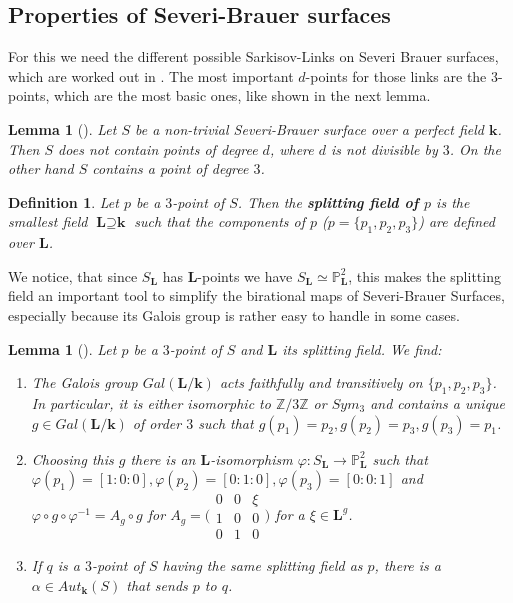 \documentclass[12pt, oneside, reqno]{amsart}
\newtheorem{lemma}[theorem]{Lemma}
\newtheorem{definition}[theorem]{Definition}
\begin{document}
\subsection{Properties of Severi-Brauer surfaces}
For this we need the different possible Sarkisov-Links on Severi Brauer surfaces, which are worked out in \cite{BSY}. The most important $d$-points for those links are the $3$-points, which are the most basic ones, like shown in the next lemma. 
\begin{lemma}[{\cite[Corollary 2.2.2 with $p=3$]{BSY}}]
    Let $S$ be a non-trivial Severi-Brauer surface over a perfect field $\textbf{k}$. Then $S$ does not contain points of degree $d$, where $d$ is not divisible by $3$. On the other hand $S$ contains a point of degree $3$. 
\end{lemma}
\noindent
\begin{definition}
    Let $p$ be a $3$-point of $S$. Then the \textbf{splitting field of $p$} is the smallest field $\textbf{L} \supseteq \textbf{k}$ such that the components of $p$ ($p = \{ p_1, p_2, p_3 \}$) are defined over $\textbf{L}$.
\end{definition}
\noindent
We notice, that since $S_{\textbf{L}}$ has $\textbf{L}$-points we have $S_{\textbf{L}} \simeq \mathbb{P}^2_{\textbf{L}}$, this makes the splitting field an important tool to simplify the birational maps of Severi-Brauer Surfaces, especially because its Galois group is rather easy to handle in some cases.
\begin{lemma} [{\cite[Lemma 2.3.2]{BSY}}] \label{3pLem}
    Let $p$ be a $3$-point of $S$ and $\textbf{L}$ its splitting field. We find:
    \begin{enumerate}
        \item[(1)] The Galois group $Gal(\textbf{L}/\textbf{k})$ acts faithfully and transitively on $\{ p_1, p_2, p_3 \}$. In particular, it is either isomorphic to $\mathbb{Z}/3\mathbb{Z}$ or $Sym_3$ and contains a unique $g \in Gal(\textbf{L}/\textbf{k})$ of order $3$ such that $g(p_1) = p_2, g(p_2) = p_3, g(p_3) = p_1$.
        \item[(2)] Choosing this $g$ there is an $\textbf{L}$-isomorphism $\varphi : S_{\textbf{L}} \rightarrow \mathbb{P}^2_{\textbf{L}}$ such that $\varphi(p_1) = [1:0:0], \varphi(p_2) = [0:1:0], \varphi(p_3) = [0:0:1]$ and $\varphi \circ g \circ \varphi^{-1} = A_g \circ g$ for 
        $A_g = \big(\begin{smallmatrix}
        0 & 0 & \xi\\
        1 & 0 & 0 \\
        0 & 1 & 0
        \end{smallmatrix}\big)$
        for a $\xi \in \textbf{L}^g$.
        \item[(3)] If $q$ is a $3$-point of $S$ having the same splitting field as $p$, there is a $\alpha \in Aut_{\textbf{k}}(S)$ that sends $p$ to $q$. 
    \end{enumerate}
\end{lemma}
\end{document}
